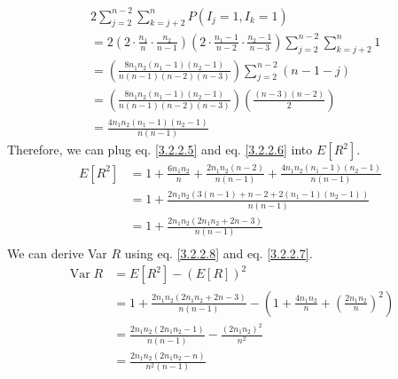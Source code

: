 \documentclass[a4paper,12pt]{article}
\begin{document}
\begin{equation}\label{3.2.2.6}
\begin{aligned}
&2 \sum _ { j = 2 } ^ { n-2 } \sum _ { k = j + 2 } ^ { n } P \left( I _ { j } = 1 , I _ { k } = 1 \right) \\
& = 2 \left( 2 \cdot \frac { n_1 } { n } \cdot \frac { n_2 } { n - 1 } \right) \left( 2 \cdot \frac { n_1 - 1 } { n - 2 } \cdot \frac { n_2 - 1 } { n - 3 } \right) \sum _ { j = 2 } ^ { n-2 } \sum _ { k = j + 2 } ^ { n } 1  \\
& = \left( \frac { 8 n_1 n_2 ( n_1 - 1 ) ( n_2 - 1 ) } {  n  ( n - 1 ) ( n - 2 ) ( n - 3 ) } \right) \sum_{j=2}^ { n-2 } ( n - 1 - j ) \\
& = \left( \frac { 8 n_1 n_2 ( n_1 - 1 ) ( n_2 - 1 ) } {  n ( n - 1 ) ( n - 2 ) ( n - 3 ) } \right) \left( \frac { ( n - 3 ) ( n- 2 ) } { 2 } \right)\\
& = \frac { 4 n_1 n_2 ( n_1 - 1 ) ( n_2 - 1 ) } {  n  ( n - 1 ) }
\end{aligned}
\end{equation}
Therefore, we can plug eq. \eqref{3.2.2.5} and eq. \eqref{3.2.2.6} into $E[R^2]$.\\
\begin{equation}\label{3.2.2.7}
\begin{aligned}
E \left[ R ^ { 2 } \right]
&= 1 + \frac { 6 n_1 n_2 } { n } + \frac { 2 n_1 n_2 ( n - 2 ) } {  n  ( n - 1 ) } + \frac { 4 n_1 n_2 ( n_1 - 1 ) ( n_2 - 1 ) } {  n  ( n - 1 ) }\\
&= 1 + \frac { 2 n_1 n_2 ( 3 ( n - 1 ) +n - 2 + 2 ( n_1 - 1 ) ( n_2 - 1 ) ) } {  n  ( n - 1 ) }\\
&= 1 + \frac { 2 n_1 n_2 ( 2 n_1 n_2 + 2 n - 3 ) } {  n  ( n - 1 ) }\\
\end{aligned}
\end{equation}
We can derive  Var $R$ using eq. \eqref{3.2.2.8} and eq. \eqref{3.2.2.7}.\\
\begin{equation*}
\begin{aligned} \operatorname { Var }  R  & = E \left[ R ^ { 2 } \right] - ( E [ R ] ) ^ { 2 } \\ & = 1 + \frac { 2 n_1 n_2 ( 2 n_1 n_2 + 2 n - 3 ) } {  n  ( n - 1 ) } - \left( 1 + \frac { 4 n_1 n_2 } { n } + \left( \frac { 2 n_1 n_2 } { n } \right) ^ { 2 } \right)\\
&= \frac { 2 n_1 n_2 ( 2 n_1 n_2- 1 ) } {  n  ( n - 1 ) } - \frac { ( 2 n_1 n_2 ) ^ { 2 } } {  n  ^ { 2 } }  \\
&= \frac { 2 n_1 n_2 ( 2n_1 n_2 - n ) } { n  ^ { 2 } ( n - 1 ) }\\
\end{aligned}
\end{equation*}
\end{document}
